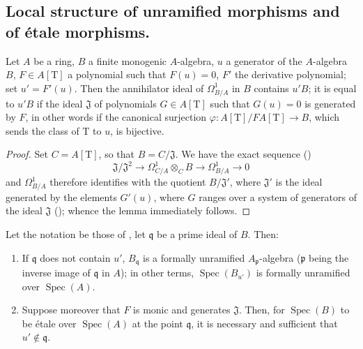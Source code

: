 \subsection{Local structure of unramified morphisms and of \'etale morphisms.}
\label{subsection:IV.18.4}


\begin{lemma}[18.4.1]
\label{IV.18.4.1}
Let $A$ be a ring, $B$ a finite monogenic $A$-algebra, $u$ a generator of the $A$-algebra $B$, $F\in A[\mathrm{T}]$ a polynomial such that $F(u)=0$, $F'$ the derivative polynomial;
set $u'=F'(u)$.
Then the annihilator ideal of $\Omega^1_{B/A}$ in $B$ contains $u'B$;
it is equal to $u'B$ if the ideal $\mathfrak{J}$ of polynomials $G\in A[\mathrm{T}]$ such that $G(u)=0$ is generated by $F$, in other words if the canonical surjection $\varphi:A[\mathrm{T}]/F A[\mathrm{T}]\to B$, which sends the class of $\mathrm{T}$ to $u$, is bijective.
\end{lemma}

\begin{proof}
Set $C=A[\mathrm{T}]$, so that $B=C/\mathfrak{J}$.
We have the exact sequence ()
\[
\mathfrak{J}/\mathfrak{J}^2\to\Omega^1_{C/A}\otimes_C B\to\Omega^1_{B/A}\to 0
\]
and $\Omega^1_{B/A}$ therefore identifies with the quotient $B/\mathfrak{J}'$, where $\mathfrak{J}'$ is the ideal generated by the elements $G'(u)$, where $G$ ranges over a system of generators of the ideal $\mathfrak{J}$ ();
whence the lemma immediately follows.
\end{proof}

\begin{proposition}[18.4.2]
\label{IV.18.4.2}
Let the notation be those of , let $\mathfrak{q}$ be a prime ideal of $B$.
Then:
\begin{enumerate}
  \item[(i)] If $\mathfrak{q}$ does not contain $u'$, $B_\mathfrak{q}$ is a formally unramified $A_\mathfrak{p}$-algebra ($\mathfrak{p}$ being the inverse image of $\mathfrak{q}$ in $A$);
in other terms, $\operatorname{Spec}(B_{u'})$ is formally unramified over $\operatorname{Spec}(A)$.
  \item[(ii)] Suppose moreover that $F$ is monic and generates $\mathfrak{J}$.
Then, for $\operatorname{Spec}(B)$ to be \'etale over $\operatorname{Spec}(A)$ at the point $\mathfrak{q}$, it is necessary and sufficient that $u'\notin\mathfrak{q}$.
\end{enumerate}
\end{proposition}

